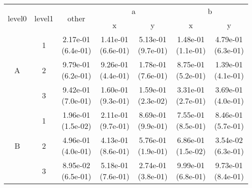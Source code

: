 \begin{tabular}{ccccccc}
\toprule
\multirow{2}{*}{level0} & \multirow{2}{*}{level1}& \multirow{2}{*}{other}&\multicolumn{2}{c}{a}&\multicolumn{2}{c}{b}\tabularnewline
\cmidrule(lr){4-5}
\cmidrule(lr){6-7}
&&&x&y&x&y\tabularnewline
\midrule
\multirow{3}{*}{A}&1& 2.17e-01 (6.4e-01)& 1.41e-01 (6.6e-01)& 5.13e-01 (9.7e-01)& 1.48e-01 (1.1e-01)& 4.79e-01 (6.3e-01)\tabularnewline
&2& 9.79e-01 (6.2e-01)& 9.26e-01 (4.4e-01)& 1.78e-01 (7.6e-01)& 8.75e-01 (5.2e-01)& 1.39e-01 (4.1e-01)\tabularnewline
&3& 9.42e-01 (7.0e-01)& 1.60e-01 (9.3e-01)& 1.59e-01 (2.3e-02)& 3.31e-01 (2.7e-01)& 3.69e-01 (4.0e-01)\tabularnewline
\midrule
\multirow{3}{*}{B}&1& 1.96e-01 (1.5e-02)& 2.11e-01 (9.7e-01)& 8.69e-01 (9.9e-01)& 7.55e-01 (8.5e-01)& 8.46e-01 (5.7e-01)\tabularnewline
&2& 4.96e-01 (4.0e-01)& 4.13e-01 (8.6e-01)& 5.76e-01 (1.9e-01)& 6.86e-01 (1.5e-02)& 3.54e-02 (6.3e-01)\tabularnewline
&3& 8.95e-02 (6.5e-01)& 5.18e-01 (7.6e-01)& 2.74e-01 (3.8e-01)& 9.99e-01 (6.8e-01)& 9.73e-01 (8.4e-01)\tabularnewline
\bottomrule
\end{tabular}
